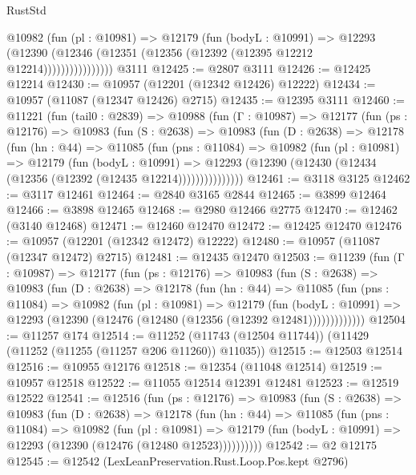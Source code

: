 \begin{lexlean}{RustStd}
\begin{coremodule}
{\begin{coremodule}
{{{{{{{{{{{{{{{{{{{{{{{{{{{{{{{{{                  @10982
                    (fun (pl : @10981) =>
                    @12179
                      (fun (bodyL : @10991) =>
                      @12293
                        (@12390
                          (@12346 (@12351 (@12356 (@12392 (@12395 @12212 @12214))))))))))))))))
    @3111
@12425 := @2807 @3111
@12426 := @12425 @12214
@12430 := @10957 (@12201 (@12342 @12426) @12222)
@12434 := @10957 (@11087 (@12347 @12426) @2715)
@12435 := @12395 @3111
@12460 := @11221
    (fun (tail0 : @2839) =>
    @10988
      (fun (Γ : @10987) =>
      @12177
        (fun (ps : @12176) =>
        @10983
          (fun (S : @2638) =>
          @10983
            (fun (D : @2638) =>
            @12178
              (fun (hn : @44) =>
              @11085
                (fun (pns : @11084) =>
                @10982
                  (fun (pl : @10981) =>
                  @12179
                    (fun (bodyL : @10991) =>
                    @12293 (@12390 (@12430 (@12434 (@12356 (@12392 (@12435 @12214)))))))))))))))
@12461 := @3118 @3125
@12462 := @3117 @12461
@12464 := @2840 @3165 @2844
@12465 := @3899 @12464
@12466 := @3898 @12465
@12468 := @2980 @12466 @2775
@12470 := @12462 (@3140 @12468)
@12471 := @12460 @12470
@12472 := @12425 @12470
@12476 := @10957 (@12201 (@12342 @12472) @12222)
@12480 := @10957 (@11087 (@12347 @12472) @2715)
@12481 := @12435 @12470
@12503 := @11239
    (fun (Γ : @10987) =>
    @12177
      (fun (ps : @12176) =>
      @10983
        (fun (S : @2638) =>
        @10983
          (fun (D : @2638) =>
          @12178
            (fun (hn : @44) =>
            @11085
              (fun (pns : @11084) =>
              @10982
                (fun (pl : @10981) =>
                @12179
                  (fun (bodyL : @10991) =>
                  @12293 (@12390 (@12476 (@12480 (@12356 (@12392 @12481)))))))))))))
@12504 := @11257 @174
@12514 := @11252 (@11743 (@12504 @11744)) (@11429 (@11252 (@11255 (@11257 @206 @11260)) @11035))
@12515 := @12503 @12514
@12516 := @10955 @12176
@12518 := @12354 (@11048 @12514)
@12519 := @10957 @12518
@12522 := @11055 @12514 @12391 @12481
@12523 := @12519 @12522
@12541 := @12516
    (fun (ps : @12176) =>
    @10983
      (fun (S : @2638) =>
      @10983
        (fun (D : @2638) =>
        @12178
          (fun (hn : @44) =>
          @11085
            (fun (pns : @11084) =>
            @10982
              (fun (pl : @10981) =>
              @12179 (fun (bodyL : @10991) => @12293 (@12390 (@12476 (@12480 @12523))))))))))
@12542 := @2 @12175
@12545 := @12542 (LexLeanPreservation.Rust.Loop.Pos.kept @2796)
}}}}}}}}}}}}}}}}}}}}}}}}}}}}}}}}}
\end{coremodule}}
\end{coremodule}
\end{lexlean}
